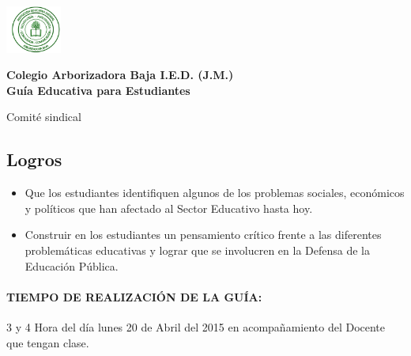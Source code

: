 \documentclass[10pt,twoside]{article}
\author{Comité sindical}
\date{}
\begin{document}
\begin{minipage}{.2\textwidth}
\includegraphics[height=1.55cm]{Images/logo-colegio.png}\end{minipage}
\begin{minipage}{.75\textwidth}
\begin{center}
\textbf{\large Colegio Arborizadora Baja I.E.D. (J.M.)}\\
\textbf{\large Guía Educativa para Estudiantes}\\
\end{center}
\end{minipage}\hfill
\begin{center}
\large Comité sindical
\end{center}
\subsection*{Logros}
\begin{itemize}
\item Que los estudiantes identifiquen algunos de los problemas sociales, económicos y políticos  que han afectado al Sector Educativo hasta hoy.
\item Construir en los estudiantes un pensamiento crítico frente a las diferentes problemáticas educativas y lograr que se involucren en la Defensa de la Educación Pública.
\end{itemize}
\paragraph*{TIEMPO DE REALIZACIÓN DE LA GUÍA:}3 y 4 Hora del día lunes 20 de Abril del 2015 en acompañamiento del Docente que tengan clase.
\end{document}
